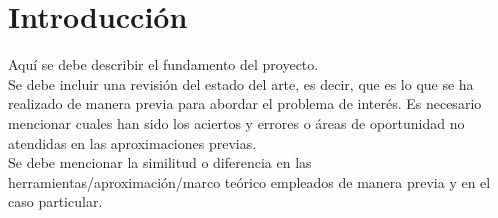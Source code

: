\chapter{Introducción}

Aquí se debe describir el fundamento del proyecto.\\

Se debe incluir una revisión del estado del arte, es decir, que es lo que se ha realizado de manera previa para abordar el problema de interés. Es necesario mencionar cuales han sido los aciertos y errores o áreas de oportunidad no atendidas en las aproximaciones previas.\\

Se debe mencionar la similitud o diferencia en las herramientas/aproximación/marco teórico empleados de manera previa y en el caso particular.

